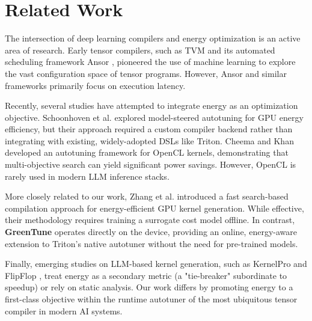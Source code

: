 \section{Related Work}
\label{sec:related_work}

The intersection of deep learning compilers and energy optimization is an active area of research. Early tensor compilers, such as TVM and its automated scheduling framework Ansor \cite{zheng2020ansor}, pioneered the use of machine learning to explore the vast configuration space of tensor programs. However, Ansor and similar frameworks primarily focus on execution latency.

Recently, several studies have attempted to integrate energy as an optimization objective. Schoonhoven et al. \cite{schoonhoven2022going} explored model-steered autotuning for GPU energy efficiency, but their approach required a custom compiler backend rather than integrating with existing, widely-adopted DSLs like Triton. Cheema and Khan \cite{cheema2023gpuautotuning} developed an autotuning framework for OpenCL kernels, demonstrating that multi-objective search can yield significant power savings. However, OpenCL is rarely used in modern LLM inference stacks.

More closely related to our work, Zhang et al. \cite{zhang2024automating} introduced a fast search-based compilation approach for energy-efficient GPU kernel generation. While effective, their methodology requires training a surrogate cost model offline. In contrast, \textbf{GreenTune} operates directly on the device, providing an online, energy-aware extension to Triton's native autotuner without the need for pre-trained models.

Finally, emerging studies on LLM-based kernel generation, such as KernelPro \cite{kernelpro2026} and FlipFlop \cite{flipflop2026}, treat energy as a secondary metric (a "tie-breaker" subordinate to speedup) or rely on static analysis. Our work differs by promoting energy to a first-class objective within the runtime autotuner of the most ubiquitous tensor compiler in modern AI systems.
